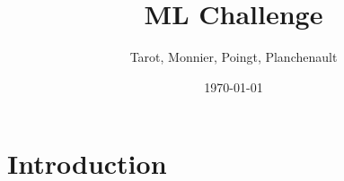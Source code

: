 \documentclass{article}
\begin{document}
\title{ML Challenge}
\author{Tarot, Monnier, Poingt, Planchenault}
\date{\today}

\maketitle

\section{Introduction}
\end{document}
